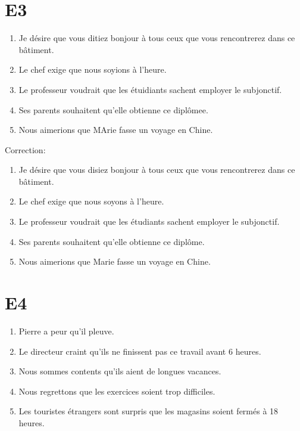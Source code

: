\documentclass{book}
\begin{document}
    \section{E3}
        \begin{enumerate}
            \item Je désire que vous ditiez bonjour à tous ceux que vous rencontrerez dans ce bâtiment.
            \item Le chef exige que nous soyions à l'heure.
            \item Le professeur voudrait que les étuidiants sachent employer le subjonctif.
            \item Ses parents souhaitent qu'elle obtienne ce diplômee.
            \item Nous aimerions que MArie fasse un voyage en Chine.
        \end{enumerate}
        Correction:
        \begin{enumerate}
            \item Je désire que vous disiez bonjour à tous ceux que vous rencontrerez dans ce bâtiment.
            \item Le chef exige que nous soyons à l'heure.
            \item Le professeur voudrait que les étudiants sachent employer le subjonctif.
            \item Ses parents souhaitent qu'elle obtienne ce diplôme.
            \item Nous aimerions que Marie fasse un voyage en Chine.
        \end{enumerate}

    \section{E4}
        \begin{enumerate}
            \item Pierre a peur qu'il pleuve.
            \item Le directeur craint qu'ils ne finissent pas ce travail avant 6 heures.
            \item Nous sommes contents qu'ils aient de longues vacances.
            \item Nous regrettons que les exercices soient trop difficiles.
            \item Les touristes étrangers sont surpris que les magasins soient fermés à 18 heures.
        \end{enumerate}
\end{document}

